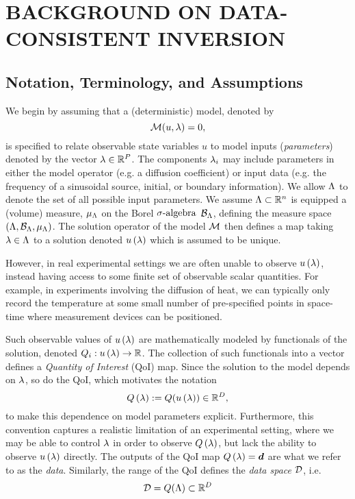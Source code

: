 \chapter{\uppercase{Background on Data-Consistent Inversion} \label{chapter:02}}

\section{Notation, Terminology, and Assumptions}

We begin by assuming that a (deterministic) model, denoted by $$\operatorname*{\mathcal{M}} (u, \lambda) = 0,$$ is specified to relate observable state variables $u$ to model inputs ({\em parameters}) denoted by the vector $\lambda\in\mathbb{R}^P$.
The components $\lambda_i$ may include parameters in either the model operator (e.g. a diffusion coefficient) or input data (e.g. the frequency of a sinusoidal source, initial, or boundary information).
We allow ${\Lambda}$ to denote the set of all possible input parameters. 
We assume ${\Lambda}\subset \mathbb{R}^n$ is equipped a (volume) measure, $\mu_{{\Lambda}}$ on the Borel $\sigma\text{-algebra}$ $\mathcal{B}_{{\Lambda}}$, defining the measure space $({\Lambda}, \mathcal{B}_{{\Lambda}}, \mu_{{\Lambda}})$.
The solution operator of the model $\operatorname*{\mathcal{M}}$ then defines a map taking $\lambda \in {\Lambda}$ to a solution denoted $u\left ( \lambda \right )$ which is assumed to be unique. 

However, in real experimental settings we are often unable to observe $u\left ( \lambda \right )$, instead having access to some finite set of observable scalar quantities. 
For example, in experiments involving the diffusion of heat, we can typically only record the temperature at some small number of pre-specified points in space-time where measurement devices can be positioned.

Such observable values of $u\left ( \lambda \right )$ are mathematically modeled by functionals of the solution, denoted $Q_i: u\left ( \lambda \right ) \to \mathbb{R}$.
The collection of such functionals into a vector defines a {\em Quantity of Interest} (QoI) map. 
Since the solution to the model depends on $\lambda$, so do the QoI, which motivates the notation 
$$Q\left ( \lambda \right ) := Q( u\left ( \lambda \right ) ) \in\mathbb{R}^D,$$
to make this dependence on model parameters explicit.
Furthermore, this convention captures a realistic limitation of an experimental setting, where we may be able to control $\lambda$ in order to observe $Q\left ( \lambda \right )$, but lack the ability to observe $u\left ( \lambda \right )$ directly.
The outputs of the QoI map $Q\left ( \lambda \right ) = \operatorname*{\boldsymbol{d}}$ are what we refer to as the \emph{data}. 
Similarly, the range of the QoI defines the \emph{data space} $\mathcal{D}$, i.e. 
$$\mathcal{D} = Q({\Lambda}) \subset \mathbb{R}^D$$

